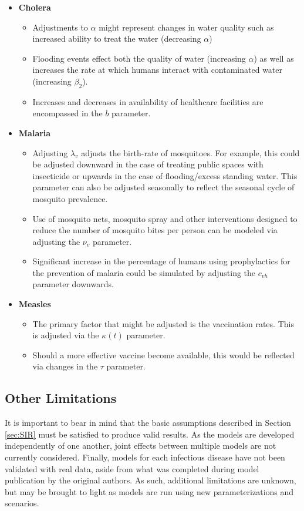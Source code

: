 \documentclass[letter,12pt, usenames,dvipsnames]{article}
\begin{document}
\begin{itemize}
    \item {\bf Cholera}
        \begin{itemize}
            \item Adjustments to $\alpha$ might represent changes in water quality such as increased ability to treat the water (decreasing $\alpha$)
            \item Flooding events effect both the quality of water (increasing $\alpha$) as well as increases the rate at which humans interact with contaminated water (increasing $\beta_2$).
            \item Increases and decreases in availability of healthcare facilities are encompassed in the $b$ parameter.
        \end{itemize}
    \item {\bf Malaria}
        \begin{itemize}
            \item Adjusting $\lambda_v$ adjusts the birth-rate of mosquitoes.  For example, this could be adjusted downward in the case of treating public spaces with insecticide or upwards in the case of flooding/excess standing water.  This parameter can also be adjusted seasonally to reflect the seasonal cycle of mosquito prevalence. 
            \item Use of mosquito nets, mosquito spray and other interventions designed to reduce the number of mosquito bites per person can be modeled via adjusting the $\nu_v$ parameter.
            \item Significant increase in the percentage of humans using prophylactics for the prevention of malaria could be simulated by adjusting the $c_{vh}$ parameter downwards.
        \end{itemize}
    \item {\bf Measles}
        \begin{itemize}
            \item The primary factor that might be adjusted is the vaccination rates.  This is adjusted via the $\kappa (t)$ parameter. 
            \item Should a more effective vaccine become available, this would be reflected via changes in the $\tau$ parameter.
        \end{itemize}
\end{itemize}

\subsection{Other Limitations}
It is important to bear in mind that the basic assumptions described in Section \ref{sec:SIR} must be satisfied to produce valid results. As the models are developed independently of one another, joint effects between multiple models are not currently considered. Finally, models for each infectious disease have not been validated with real data, aside from what was completed during model publication by the original authors. As such, additional limitations are unknown, but may be brought to light as models are run using new parameterizations and scenarios.
\end{document}
